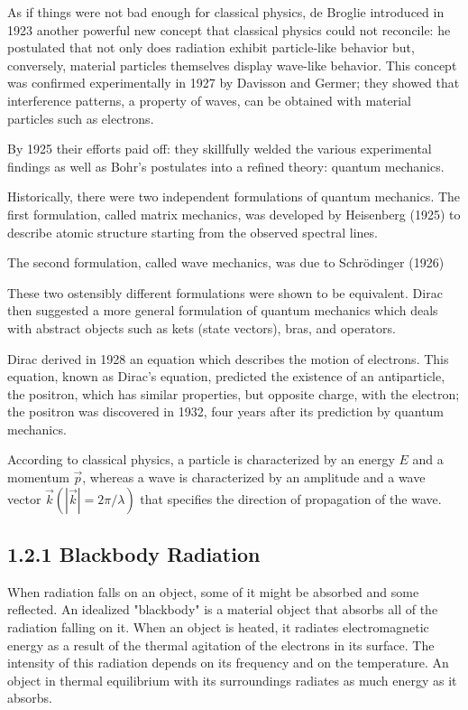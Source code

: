 \documentclass[10pt]{article}
\begin{document}
    As if things were not bad enough for classical physics, de Broglie introduced in 1923 another powerful new concept that classical physics could not reconcile: he postulated that not only does radiation exhibit particle-like behavior but, conversely, material particles themselves display wave-like behavior. This concept was confirmed experimentally in 1927 by Davisson and Germer; they showed that interference patterns, a property of waves, can be obtained with material particles such as electrons.

    By 1925 their efforts paid off: they skillfully welded the various experimental findings as well as Bohr's postulates into a refined theory: quantum mechanics. 
    
    Historically, there were two independent formulations of quantum mechanics. The first formulation, called matrix mechanics, was developed by Heisenberg (1925) to describe atomic structure starting from the observed spectral lines.
    
    The second formulation, called wave mechanics, was due to Schrödinger (1926)
    
    These two ostensibly different formulations were shown to be equivalent. Dirac then suggested a more general formulation of quantum mechanics which deals with abstract objects such as kets (state vectors), bras, and operators. 
    
    Dirac derived in 1928 an equation which describes the motion of electrons. This equation, known as Dirac's equation, predicted the existence of an antiparticle, the positron, which has similar properties, but opposite charge, with the electron; the positron was discovered in 1932, four years after its prediction by quantum mechanics.
    
    According to classical physics, a particle is characterized by an energy $E$ and a momentum $\vec{p}$, whereas a wave is characterized by an amplitude and a wave vector $\vec{k}(|\vec{k}|=2 \pi / \lambda)$ that specifies the direction of propagation of the wave. 

\subsection*{1.2.1 Blackbody Radiation}
    When radiation falls on an object, some of it might be absorbed and some reflected. An idealized "blackbody" is a material object that absorbs all of the radiation falling on it. When an object is heated, it radiates electromagnetic energy as a result of the thermal agitation of the electrons in its surface. The intensity of this radiation depends on its frequency and on the temperature. An object in thermal equilibrium with its surroundings radiates as much energy as it absorbs.
\end{document}
